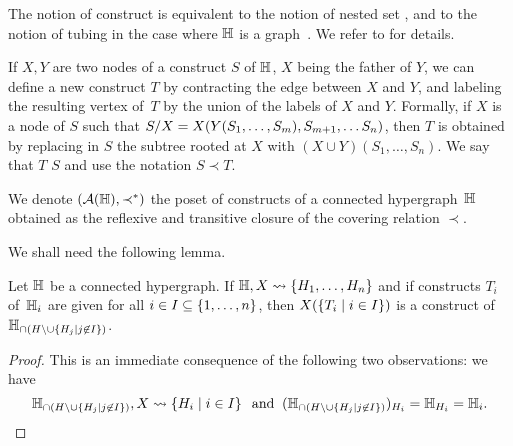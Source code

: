 \begin{rem}
    The notion of construct is equivalent to the notion of nested set \cite{P09}, and to the notion of tubing in the case where ${\mathbb H}$ is a graph~\cite{CD-CCGA}.  
    We refer to \cite[Sec.~3.1]{COI} for details.
\end{rem}


If $X,Y$ are two nodes of a construct $S$ of ${\mathbb H}$, $X$ being the father of $Y$, we can define a new construct $T$ by contracting the edge between $X$ and $Y$, and labeling the resulting vertex of~$T$ by the union of the labels of $X$ and $Y$. 
Formally, if $X$ is a node of $S$ such that $S/X=X(Y(S_1,\ldots,S_m),S_{m+1},\ldots S_n)$, then  $T$ is obtained by replacing in $S$ the  subtree rooted at $X$ with $(X\cup Y)(S_1,\ldots,S_n)$.  
We say that $T$  $S$ and use the notation $S\prec T$.


\begin{definition} 
  \label{subface-relation}
    We denote $({\cal A}({\mathbb H}),\prec^*)$ the poset of constructs of a connected hypergraph~${\mathbb H}$ obtained as the reflexive and transitive closure of the  covering relation $\prec$.    
\end{definition}
    
We shall need the following lemma.
\begin{lemma} 
  \label{partial-construct}
Let ${\mathbb H}$ be a connected hypergraph. 
If ${\mathbb H},X\leadsto \{H_1,\ldots,H_n\}$ and if constructs $T_i$ of~${\mathbb H}_i$ are given for all $i\in I\subseteq \left\{1,\ldots,n\right\}$, then $X(\left\{T_i \mid i\in I\right\})$ is a construct of ${\mathbb H}_{\cap (H\setminus\cup\left\{H_j \mid j\not\in I\right\})}$.
\end{lemma}
\begin{proof} This is an immediate consequence of the following two observations: we have
$${\mathbb H}_{\cap (H\setminus\cup\left\{H_j \mid j\not\in I\right\})},X\leadsto \left\{H_i \mid i\in I\right\}\;\; \mbox{and}\;\; ({\mathbb H}_{\cap (H\setminus\cup\left\{H_j \mid j\not\in I\right\})})_{H_i}={\mathbb H}_{H_i}={\mathbb H}_i.$$
\end{proof}

